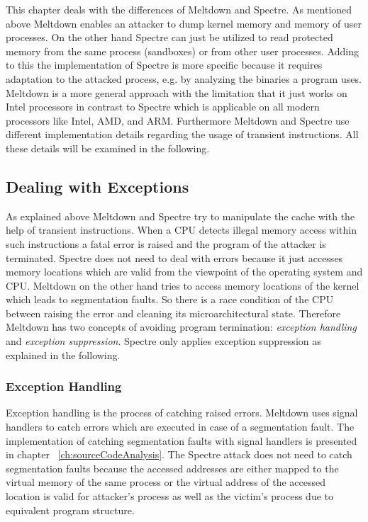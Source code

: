 \documentclass[a4paper,oneside,openright] {scrreprt}
\begin{document}
This chapter deals with the differences of Meltdown and Spectre. As mentioned above Meltdown enables an attacker 
to dump kernel memory and memory of user processes. On the other hand Spectre can just be utilized to read protected memory from 
the same process (sandboxes) or from other user processes.
Adding to this the implementation of Spectre is more specific because it requires adaptation to the attacked process,
 e.g. by analyzing the binaries a program uses. Meltdown is a more general approach with the limitation that it just works on Intel
 processors in contrast to Spectre which is applicable on all modern processors like Intel, AMD, and ARM. Furthermore Meltdown and 
 Spectre use different implementation details regarding the usage of transient instructions.
 All these details will be examined in the following.

\subsection{Dealing with Exceptions}
\label{ch:intro:motivation:A}

As explained above Meltdown and Spectre try to manipulate the cache with the help of transient instructions. 
When a CPU detects illegal memory access within such instructions a fatal error is raised and the program of the attacker
is terminated. Spectre does not need to deal with errors because it just accesses memory locations which are valid from
the viewpoint of the operating system and CPU.
Meltdown on the other hand tries to access memory locations of the kernel which leads to segmentation faults.
So there is a race condition of the CPU between raising the error and cleaning its microarchitectural state.
Therefore Meltdown has two concepts of avoiding program termination: \textit{exception handling} and \textit{exception suppression}.
Spectre only applies exception suppression as explained in the following.

\subsubsection{Exception Handling}

Exception handling is the process of catching raised errors. Meltdown uses signal handlers to catch errors
which are executed in case of a segmentation fault. The implementation of catching 
segmentation faults with signal handlers is presented in chapter ~\ref{ch:sourceCodeAnalysis}.
The Spectre attack does not need to catch segmentation faults because the accessed addresses are either
mapped to the virtual memory of the same process or the virtual address of the accessed location is valid 
for attacker's process as well as the victim's process due to equivalent program structure.
\end{document}
